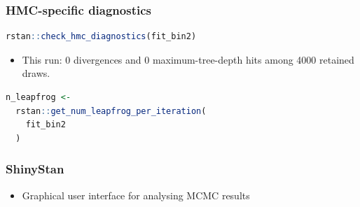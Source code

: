 \documentclass[10pt]{beamer}
\begin{document}
\begin{frame}[fragile]

\frametitle{HMC-specific diagnostics}

  {\small
\begin{lstlisting}[language=R]
rstan::check_hmc_diagnostics(fit_bin2)
\end{lstlisting}
  }

  \begin{itemize}
  \item This run: 0 divergences and 0 maximum-tree-depth hits among 4000 retained draws.
  \end{itemize}

  {\small
\begin{lstlisting}[language=R]
n_leapfrog <-
  rstan::get_num_leapfrog_per_iteration(
    fit_bin2
  )
\end{lstlisting}
  }

\end{frame}

\begin{frame}[fragile]

\frametitle{ShinyStan}

  \begin{itemize}
  \item Graphical user interface for analysing MCMC results
  \end{itemize}

\end{frame}

%
%

\end{document}
